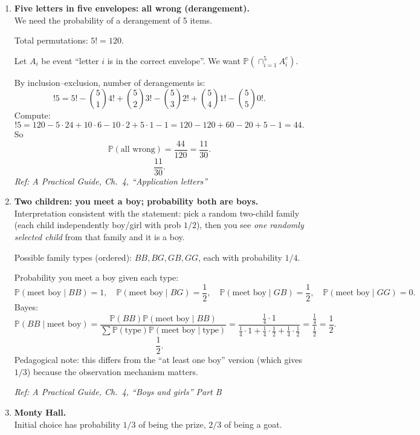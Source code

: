 \documentclass[11pt]{article}
\begin{document}
\begin{enumerate}[label=\textbf{\arabic*.}, resume]
\item \textbf{Five letters in five envelopes: all wrong (derangement).}\\
We need the probability of a derangement of 5 items.

Total permutations: $5!=120$.

Let $A_i$ be event ``letter $i$ is in the correct envelope''.
We want $\mathbb{P}(\cap_{i=1}^5 A_i^c)$.

By inclusion--exclusion, number of derangements is:
\[
!5 = 5! - \binom51 4! + \binom52 3! - \binom53 2! + \binom54 1! - \binom55 0!.
\]
Compute:
\[
!5 = 120 - 5\cdot 24 + 10\cdot 6 - 10\cdot 2 + 5\cdot 1 - 1
=120-120+60-20+5-1=44.
\]
So
\[
\mathbb{P}(\text{all wrong})=\frac{44}{120}=\frac{11}{30}.
\]
\[
\boxed{\frac{11}{30}.}
\]
\hfill{\small\textit{Ref: A Practical Guide, Ch.\ 4, ``Application letters''}}

\item \textbf{Two children: you meet a boy; probability both are boys.}\\
Interpretation consistent with the statement: pick a random two-child family (each child independently boy/girl with prob $1/2$), then you see \emph{one randomly selected child} from that family and it is a boy.

Possible family types (ordered): $BB, BG, GB, GG$, each with probability $1/4$.

Probability you meet a boy given each type:
\[
\mathbb{P}(\text{meet boy}\mid BB)=1,\quad
\mathbb{P}(\text{meet boy}\mid BG)=\frac12,\quad
\mathbb{P}(\text{meet boy}\mid GB)=\frac12,\quad
\mathbb{P}(\text{meet boy}\mid GG)=0.
\]
Bayes:
\[
\mathbb{P}(BB\mid \text{meet boy})
=\frac{\mathbb{P}(BB)\mathbb{P}(\text{meet boy}\mid BB)}{\sum \mathbb{P}(\text{type})\mathbb{P}(\text{meet boy}\mid \text{type})}
=\frac{\frac14\cdot 1}{\frac14\cdot 1+\frac14\cdot\frac12+\frac14\cdot\frac12}
=\frac{\frac14}{\frac12}=\frac12.
\]
\[
\boxed{\frac12.}
\]
Pedagogical note: this differs from the ``at least one boy'' version (which gives $1/3$) because the observation mechanism matters.

\hfill{\small\textit{Ref: A Practical Guide, Ch.\ 4, ``Boys and girls'' Part B}}

\item \textbf{Monty Hall.}\\
Initial choice has probability $1/3$ of being the prize, $2/3$ of being a goat.


\end{enumerate}
\end{document}
